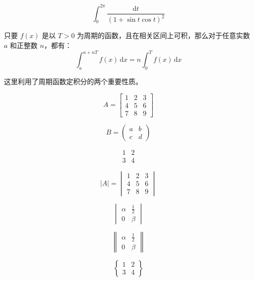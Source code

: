 \documentclass{ctexart}
\begin{document}
\[
\int_{0}^{2\pi}\frac{\mathrm{d}t}{(1+\sin t \cos t)^2}
\]

只要 \(f(x)\) 是以 \(T>0\) 为周期的函数，且在相关区间上可积，那么对于任意实数 \(a\) 和正整数 \(n\)，都有：
\[
\boxed{\int_a^{a+nT}f(x)\,\mathrm dx=n\int_0^T f(x)\,\mathrm dx}
\]

这里利用了周期函数定积分的两个重要性质。

\[
A = \begin{bmatrix}
1 & 2 & 3 \\
4 & 5 & 6 \\
7 & 8 & 9
\end{bmatrix}
\]

\[
B = \begin{pmatrix}
a & b \\
c & d
\end{pmatrix}
\]

\[
\begin{matrix}
1 & 2 \\
3 & 4
\end{matrix}
\]

\[
|A| = \begin{vmatrix}
1 & 2 & 3 \\
4 & 5 & 6 \\
7 & 8 & 9
\end{vmatrix}
\]

\[
\begin{vmatrix}
\alpha & \frac12 \\
0 & \beta
\end{vmatrix}
\]

\[

\begin{Vmatrix}
\alpha & \frac12 \\
0 & \beta
\end{Vmatrix}
\]

\[
\begin{Bmatrix}
1 & 2 \\
3 & 4
\end{Bmatrix}
\]
\end{document}
